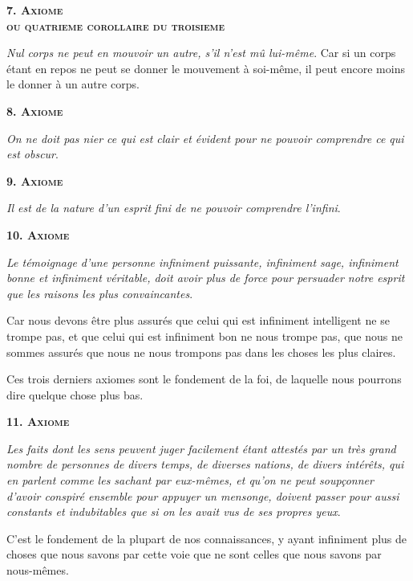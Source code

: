 \begin{center}{\scshape\bfseries 7. Axiome \\ou quatrieme corollaire du troisieme}\end{center}

	\emph{Nul corps ne peut en mouvoir un autre, s'il n'est mû lui-même}. Car si un corps étant en repos ne peut se donner le mouvement à soi-même, il peut encore moins le donner à un autre corps.

\bigbreak

\begin{center}{\scshape\bfseries 8. Axiome}\end{center}

	\emph{On ne doit pas nier ce qui est clair et évident pour ne pouvoir comprendre ce qui est obscur}.


\begin{center}{\scshape\bfseries 9. Axiome}\end{center}

	\emph{Il est de la nature d'un esprit fini de ne pouvoir comprendre l'infini}.

\begin{center}{\scshape\bfseries 10. Axiome}\end{center}

	\emph{Le témoignage d'une personne infiniment puissante, infiniment sage, infiniment bonne et infiniment véritable, doit avoir plus de force pour persuader notre esprit que les raisons les plus convaincantes}.

Car nous devons être plus assurés que celui qui est infiniment intelligent ne se trompe pas, et que celui qui est infiniment bon ne nous trompe pas, que nous ne sommes assurés que nous ne nous trompons pas dans les choses les plus claires.

Ces trois derniers axiomes sont le fondement de la foi, de laquelle nous pourrons dire quelque chose plus bas.

\begin{center}{\scshape\bfseries 11. Axiome}\end{center}

	\emph{Les faits dont les sens peuvent juger facilement étant attestés par un très grand nombre de personnes de divers temps, de diverses nations, de divers intérêts, qui en parlent comme les sachant par eux-mêmes, et qu'on ne peut soupçonner d'avoir conspiré ensemble pour appuyer un mensonge, doivent passer pour aussi constants et indubitables que si on les avait vus de ses propres yeux}.

C'est le fondement de la plupart de nos connaissances, y ayant infiniment plus de choses que nous savons par cette voie que ne sont celles que nous savons par nous-mêmes.

